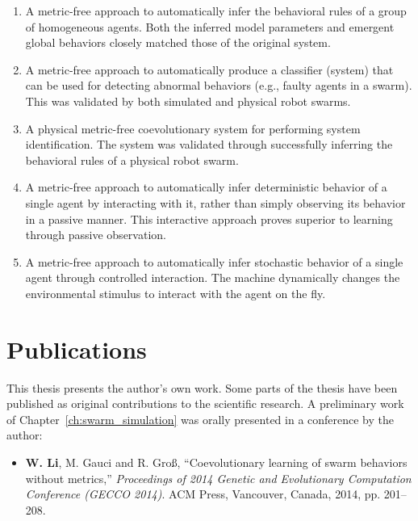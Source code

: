 \begin{enumerate}[1)]

\item A metric-free approach to automatically infer the behavioral rules of a group of homogeneous agents. Both the inferred model parameters and emergent global behaviors closely matched those of the original system. 

\item A metric-free approach to automatically produce a classifier (system) that can be used for detecting abnormal behaviors (e.g., faulty agents in a swarm). This was validated by both simulated and physical robot swarms.

\item A physical metric-free coevolutionary system for performing system identification. The system was validated through successfully inferring the behavioral rules of a physical robot swarm. 

\item A metric-free approach to automatically infer deterministic behavior of a single agent by interacting with it, rather than simply observing its behavior in a passive manner. This interactive approach proves superior to learning through passive observation. 

\item A metric-free approach to automatically infer stochastic behavior of a single agent through controlled interaction. The machine dynamically changes the environmental stimulus to interact with the agent on the fly. 

\end{enumerate}

\section{Publications}

This thesis presents the author's own work. Some parts of the thesis have been published as original contributions to the scientific research. A preliminary work of Chapter~\ref{ch:swarm_simulation} was orally presented in a conference by the author:
\begin{itemize}
%
\item \textbf{W. Li}, M. Gauci and R. Gro{\ss}, ``Coevolutionary learning of swarm behaviors without metrics,'' \textit{Proceedings of 2014 Genetic and Evolutionary Computation Conference (GECCO 2014)}. ACM Press, Vancouver, Canada, 2014, pp. 201--208.
%
\end{itemize}

